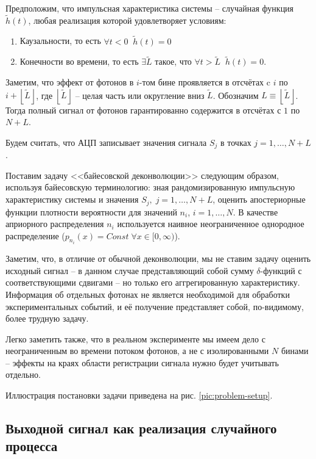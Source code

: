 \documentclass[12pt]{article}
\begin{document}
	Предположим, что импульсная характеристика системы -- случайная функция $\tilde{h}(t)$, любая реализация которой удовлетворяет условиям: 
	\begin{enumerate}
		\item Каузальности, то есть $\forall t < 0 \; \; \tilde{h}(t) = 0$
		\item Конечности во времени, то есть $\exists \tilde{L}$ такое, что $\forall t > \tilde{L} \; \; \tilde{h}(t) = 0$.
	\end{enumerate}

	Заметим, что эффект от фотонов в $i$-том бине проявляется в отсчётах c $i$ по $i + \left \lfloor{\tilde{L}}\right \rfloor$, где $\left \lfloor{\tilde{L}}\right \rfloor$ -- целая часть или округление вниз $\tilde{L}$. Обозначим $L \equiv \left \lfloor{\tilde{L}}\right \rfloor$. Тогда полный сигнал от фотонов гарантированно содержится в отсчётах с $1$ по $N + L$.
	
	Будем считать, что АЦП записывает значения сигнала $S_j$ в точках $j = 1, \ldots, N + L$.
	
	Поставим задачу <<байесовской деконволюции>> следующим образом, используя байесовскую терминологию: зная рандомизированную импульсную характеристику системы и значения $S_j, \; j = 1, \ldots, N + L$, оценить апостериорные функции плотности вероятности для значений $n_i$, $i = 1, \ldots, N$. В качестве априорного распределения $n_i$ используется наивное неограниченное однородное распределение ($p_{n_i}(x) = Const \; \forall x \in [0, \infty)$).
	
	Заметим, что, в отличие от обычной деконволюции, мы не ставим задачу оценить исходный сигнал -- в данном случае представляющий собой сумму $\delta$-функций с соответствующими сдвигами -- но только его аггрегированную характеристику. Информация об отдельных фотонах не является необходимой для обработки экспериментальных событий, и её получение представляет собой, по-видимому, более трудную задачу.
	
	Легко заметить также, что в реальном эксперименте мы имеем дело с неограниченным во времени потоком фотонов, а не с изолированными $N$ бинами -- эффекты на краях области регистрации сигнала нужно будет учитывать отдельно.
	
	Иллюстрация постановки задачи приведена на рис. \ref{pic:problem-setup}.

	\subsection{Выходной сигнал как реализация случайного процесса}
\end{document}
